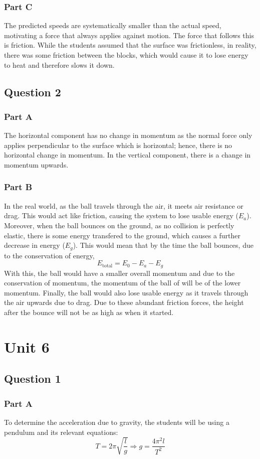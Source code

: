 \documentclass[]{scrartcl}
\begin{document}
\subsubsection*{Part C}
The predicted speeds are systematically smaller than the actual speed, motivating a force that always applies against motion. The force that follows this is friction. While the students assumed that the surface was frictionless, in reality, there was some friction between the blocks, which would cause it to lose energy to heat and therefore slows it down.
\subsection*{Question 2}
\subsubsection*{Part A}
The horizontal component has no change in momentum as the normal force only applies perpendicular to the surface which is horizontal; hence, there is no horizontal change in momentum. In the vertical component, there is a change in momentum upwards.
\subsubsection*{Part B}
In the real world, as the ball travels through the air, it meets air resistance or drag. This would act like friction, causing the system to lose usable energy ($E_a$). Moreover, when the ball bounces on the ground, as no collision is perfectly elastic, there is some energy transfered to the ground, which causes a further decrease in energy ($E_g$). This would mean that by the time the ball bounces, due to the conservation of energy,
$$E_{\text{total}} = E_0 - E_a - E_g$$
With this, the ball would have a smaller overall momentum and due to the conservation of momentum, the momentum of the ball of will be of the lower momentum. Finally, the ball would also lose usable energy as it travels through the air upwards due to drag. Due to these abundant friction forces, the height after the bounce will not be as high as when it started.
\section*{Unit 6}
\subsection*{Question 1}
\subsubsection*{Part A}
To determine the acceleration due to gravity, the students will be using a pendulum and its relevant equations:
$$T = 2\pi\sqrt{\dfrac{l}{g}}\Longrightarrow  \boxed{g = \dfrac{4\pi^2 l}{T^2}}$$
\end{document}
